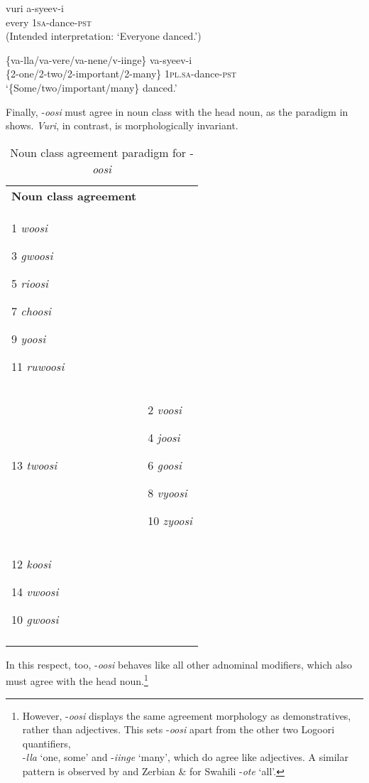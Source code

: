 \documentclass[output=paper]{langsci/langscibook}
\begin{document}
\ea
\gll *vuri    a-syeev-i  \\
     every    1\textsc{sa}{}-dance-\textsc{pst}\\
\glt (Intended interpretation: ‘Everyone danced.’)
\z

\ea
\gll \{va-lla/va-vere/va-nene/v-iinge\}  va-syeev-i\\
     \{2-one/2-two/2-important/2-many\}  1\textsc{pl}.\textsc{sa}{}-dance-\textsc{pst}\\
\glt ‘\{Some/two/important/many\} danced.’
\z

  Finally, -\textit{oosi} must agree in noun class with the head noun, as the paradigm in  shows. \textit{Vuri}, in contrast, is morphologically invariant.

\begin{table}
\caption{Noun class agreement paradigm for -\textit{oosi}}
\label{tab:1}


\begin{tabularx}{\textwidth}{XX}
\lsptoprule
\hhline{-~}
{\bfseries Noun class agreement} & \\
1  \textit{woosi}

3  \textit{gwoosi}  

5  \textit{rioosi}

7  \textit{choosi}

9  \textit{yoosi}

11  \textit{ruwoosi}\\
13  \textit{twoosi} & 2  \textit{voosi}

4  \textit{joosi}

6  \textit{goosi}

8  \textit{vyoosi}

10  \textit{zyoosi}\\
12  \textit{koosi}    

14  \textit{vwoosi}

10  \textit{gwoosi}\\
\lspbottomrule
\end{tabularx}
\end{table}

In this respect, too, -\textit{oosi} behaves like all other adnominal modifiers, which also must agree with the head noun.\footnote{ However, -\textit{oosi} displays the same agreement morphology as demonstratives, rather than adjectives. This sets -\textit{oosi} apart from the other two Logoori quantifiers, \\
{}-\textit{lla} ‘one, some’ and -\textit{iinge} ‘many’, which do agree like adjectives. A similar pattern is observed by \citet{Krifka1995} and Zerbian \& \citet{Krifka2008} for Swahili -\textit{ote} ‘all’.
} 
\end{document}
